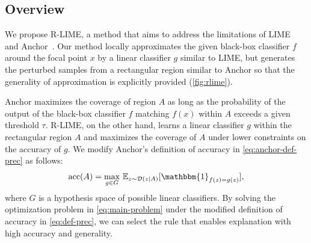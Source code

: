 \documentclass[runningheads]{llncs}
\begin{document}
\subsection{Overview}
We propose R-LIME,
a method that aims to address the limitations of LIME~\cite{ribeiro2016why}
and Anchor~\cite{ribeiro2018anchors}.
Our method locally approximates the given black-box classifier $f$
around the focal point $x$ by a linear classifier $g$ similar to LIME,
but generates the perturbed samples
from a rectangular region similar to Anchor
so that the generality of approximation is explicitly provided
(\cref{fig:rlime}).

Anchor maximizes the coverage of region $A$
as long as the probability of the output of the black-box classifier $f$ matching $f(x)$
within $A$ exceeds a given threshold $\tau$.
R-LIME, on the other hand, learns a linear classifier $g$
within the rectangular region $A$ and maximizes the coverage of $A$
under lower constraints on the accuracy of $g$.
We modify Anchor's definition of accuracy in \cref{eq:anchor-def-prec}
as follows:
\begin{equation}
  \Prec(A)=\underset{g\in G}{\max}\ \mathbb{E}_{z\sim\mathcal{D}(z|A)}
  [\mathbbm{1}_{f(z)=g(z)}], \label{eq:def-prec}
\end{equation}
where $G$ is a hypothesis space of possible linear classifiers.
By solving the optimization problem in \cref{eq:main-problem}
under the modified definition of accuracy in \cref{eq:def-prec},
we can select the rule that enables explanation with high accuracy and generality.
\end{document}
